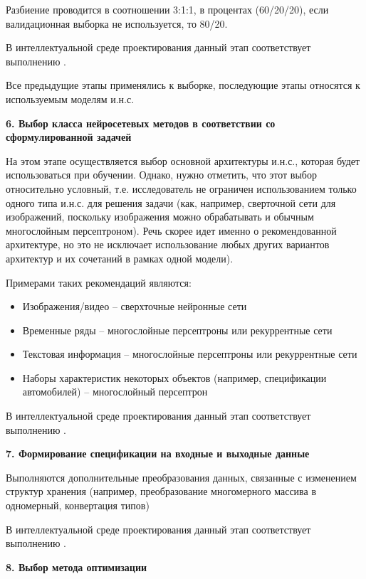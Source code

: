 Разбиение проводится в соотношении 3:1:1, в процентах (60/20/20), если валидационная выборка не используется, то 80/20.

В интеллектуальной среде проектирования данный этап соответствует выполнению .

Все предыдущие этапы применялись к выборке, последующие этапы относятся к используемым моделям и.н.с.


\textbf{6. Выбор класса нейросетевых методов в соответствии со сформулированной задачей}

На этом этапе осуществляется выбор основной архитектуры и.н.с., которая будет использоваться при обучении. Однако, нужно отметить, что этот выбор относительно условный, т.е. исследователь не ограничен использованием только одного типа и.н.с. для решения задачи (как, например, сверточной сети для изображений, поскольку изображения можно обрабатывать и обычным многослойным персептроном). Речь скорее идет именно о рекомендованной архитектуре, но это не исключает использование любых других вариантов архитектур и их сочетаний в рамках одной модели).

Примерами таких рекомендаций являются:
\begin{itemize}
	\item Изображения/видео -- сверхточные нейронные сети
	\item Временные ряды -- многослойные персептроны или рекуррентные сети
	\item Текстовая информация -- многослойные персептроны или рекуррентные сети
	\item Наборы характеристик некоторых объектов (например, спецификации автомобилей) -- многослойный персептрон
\end{itemize}

В интеллектуальной среде проектирования данный этап соответствует выполнению .


\textbf{7. Формирование спецификации на входные и выходные данные}

Выполняются дополнительные преобразования данных, связанные с изменением структур хранения (например, преобразование многомерного массива в одномерный, конвертация типов)

В интеллектуальной среде проектирования данный этап соответствует выполнению .


\textbf{8. Выбор метода оптимизации }

